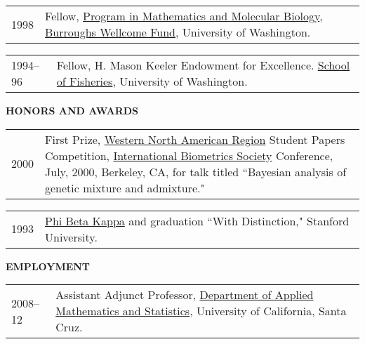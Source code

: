 \documentclass[11pt]{article}
\newlength{\myindent}
\newlength{\postskip}
\newlength{\preskip}
\newlength{\scndcol}
\begin{document}
\begin{tabular}{ @{}p{2.5\myindent} p{\scndcol}@{}  }
\hspace*{\myindent}1998   &  Fellow, \href{http://www.math.fsu.edu/~pmmb/}{Program in Mathematics and Molecular Biology}, \href{http://www.bwfund.org/}{Burroughs
Wellcome Fund}, University of Washington.
\end{tabular}

\begin{tabular}{ @{}p{2.5\myindent} p{\scndcol}@{}  }
\hspace*{\myindent}1994--96 & Fellow,  H. Mason
Keeler Endowment for Excellence.  \href{http://www.fish.washington.edu/}{School of Fisheries}, University of
Washington.\\
\end{tabular}
\vspace*{\postskip}

{\bf HONORS AND AWARDS}
\vspace*{\preskip}

\begin{tabular}{ @{}p{2.5\myindent} p{\scndcol}@{}  }
\hspace*{\myindent}2000  &  First Prize,  \href{http://www.wnar.org/}{Western North American Region} Student Papers
Competition, \href{http://www.tibs.org/}{International Biometrics Society} Conference, July, 2000, Berkeley,
CA, for talk titled ``Bayesian analysis of genetic mixture and admixture."  \\
\end{tabular}

\begin{tabular}{ @{}p{2.5\myindent} p{\scndcol}@{}  }
\hspace*{\myindent}1993  &  \href{http://www.pbk.org/}{Phi Beta Kappa} and graduation ``With Distinction," Stanford University.\\
\end{tabular}
\vspace*{\postskip}

{\bf EMPLOYMENT}
\vspace*{\preskip}

\begin{tabular}{ @{}p{2.5\myindent} p{\scndcol}@{}  }
\hspace*{\myindent}2008--12 & Assistant Adjunct  Professor, \href{http://www.ams.ucsc.edu/}{Department of Applied Mathematics and Statistics}, University of California, Santa Cruz.
\\
\end{tabular}
\end{document}
